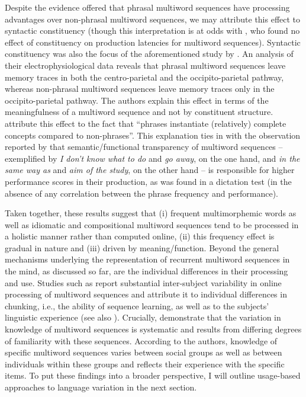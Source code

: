 Despite the evidence offered that phrasal multiword sequences have processing advantages over non-phrasal multiword sequences, we may attribute this effect to syntactic constituency (though this interpretation is at odds with \citealt{arnon-cohen}, who found no effect of constituency on production latencies for multiword sequences). Syntactic constituency was also the focus of the aforementioned study by \citet{tremblay-baayen}. An analysis of their electrophysiological data reveals that phrasal multiword sequences leave memory traces in both the centro-parietal and the occipito-parietal pathway, whereas non-phrasal multiword sequences leave memory traces only in the occipito-parietal pathway. The authors explain this effect in terms of the meaningfulness of a multiword sequence and not by constituent structure. \citet[][152]{tremblay-baayen} attribute this effect to the fact that ``phrases instantiate (relatively) complete concepts compared to non-phrases''. This explanation ties in with the observation reported by \citet{schmitt-etal} that semantic/functional transparency of multiword sequences -- exemplified by \textit{I don't know what to do} and \textit{go away}, on the one hand, and \textit{in the same way as} and \textit{aim of the study}, on the other hand -- is responsible for higher performance scores in their production, as was found in a dictation test (in the absence of any correlation between the phrase frequency and performance). 

Taken together, these results suggest that (i) frequent multimorphemic words as well as idiomatic and compositional multiword sequences tend to be processed in a holistic manner rather than computed online, (ii) this frequency effect is  gradual in nature and (iii) driven by meaning/function. Beyond the general mechanisms underlying the representation of recurrent multiword sequences in the mind, as discussed so far, are the individual differences in their processing and use. Studies such as \citet[]{mccauley-christiansen-2015} report substantial inter-subject variability in  online processing of multiword sequences and attribute it to individual differences in chunking, i.e., the ability of sequence learning, as well as to the subjects' linguistic experience (see also \citealt[][192--194]{christiansen-chater-2016}). Crucially, \citet{verhagen-etal-2018} demonstrate that the variation in knowledge of multiword sequences is systematic and results from differing degrees of familiarity with these sequences. According to the authors, knowledge of specific multiword sequences varies between social groups as well as between individuals within these groups and reflects their experience with the specific items. To put these findings into a broader perspective, I will outline usage-based approaches to language variation in the next section.

